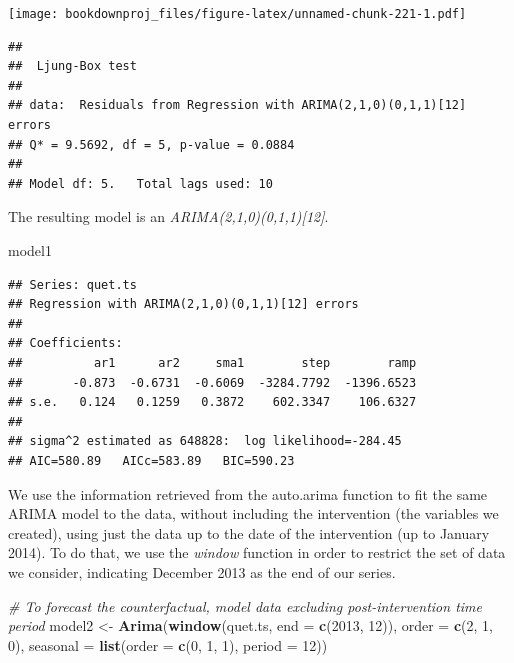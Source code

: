 \documentclass[
]{article}
\newenvironment{Shaded}{\begin{snugshade}}{\end{snugshade}}
\newcommand{\CommentTok}[1]{\textcolor[rgb]{0.56,0.35,0.01}{\textit{#1}}}
\newcommand{\DataTypeTok}[1]{\textcolor[rgb]{0.13,0.29,0.53}{#1}}
\newcommand{\DecValTok}[1]{\textcolor[rgb]{0.00,0.00,0.81}{#1}}
\newcommand{\KeywordTok}[1]{\textcolor[rgb]{0.13,0.29,0.53}{\textbf{#1}}}
\newcommand{\NormalTok}[1]{#1}
\newcommand{\StringTok}[1]{\textcolor[rgb]{0.31,0.60,0.02}{#1}}
\begin{document}
\texttt{[image: bookdownproj\_files/figure-latex/unnamed-chunk-221-1.pdf]}

\begin{verbatim}
## 
##  Ljung-Box test
## 
## data:  Residuals from Regression with ARIMA(2,1,0)(0,1,1)[12] errors
## Q* = 9.5692, df = 5, p-value = 0.0884
## 
## Model df: 5.   Total lags used: 10
\end{verbatim}

The resulting model is an \emph{ARIMA(2,1,0)(0,1,1){[}12{]}}.

\begin{Shaded}
\begin{Highlighting}[]
\NormalTok{model1}
\end{Highlighting}
\end{Shaded}

\begin{verbatim}
## Series: quet.ts 
## Regression with ARIMA(2,1,0)(0,1,1)[12] errors 
## 
## Coefficients:
##          ar1      ar2     sma1        step        ramp
##       -0.873  -0.6731  -0.6069  -3284.7792  -1396.6523
## s.e.   0.124   0.1259   0.3872    602.3347    106.6327
## 
## sigma^2 estimated as 648828:  log likelihood=-284.45
## AIC=580.89   AICc=583.89   BIC=590.23
\end{verbatim}

We use the information retrieved from the auto.arima function to fit the same ARIMA model to the data, without including the intervention (the variables we created), using just the data up to the date of the intervention (up to January 2014). To do that, we use the \emph{window} function in order to restrict the set of data we consider, indicating December 2013 as the end of our series.

\begin{Shaded}
\begin{Highlighting}[]
\CommentTok{# To forecast the counterfactual, model data excluding post-intervention time period}
\NormalTok{model2 <-}\StringTok{ }\KeywordTok{Arima}\NormalTok{(}\KeywordTok{window}\NormalTok{(quet.ts, }\DataTypeTok{end =} \KeywordTok{c}\NormalTok{(}\DecValTok{2013}\NormalTok{, }\DecValTok{12}\NormalTok{)), }\DataTypeTok{order =} \KeywordTok{c}\NormalTok{(}\DecValTok{2}\NormalTok{, }\DecValTok{1}\NormalTok{, }\DecValTok{0}\NormalTok{), }
                \DataTypeTok{seasonal =} \KeywordTok{list}\NormalTok{(}\DataTypeTok{order =} \KeywordTok{c}\NormalTok{(}\DecValTok{0}\NormalTok{, }\DecValTok{1}\NormalTok{, }\DecValTok{1}\NormalTok{), }\DataTypeTok{period =} \DecValTok{12}\NormalTok{))}
\end{Highlighting}
\end{Shaded}
\end{document}
